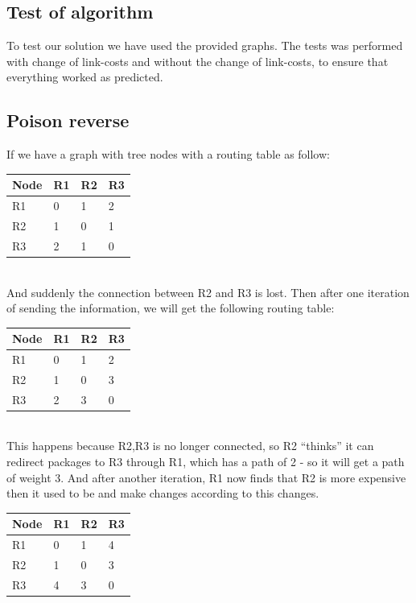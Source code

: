 \documentclass{mall}
\begin{document}
\subsection{Test of algorithm}
To test our solution we have used the provided graphs. The tests was performed with change of link-costs and without the change of link-costs, to ensure that everything worked as predicted.
\newpage
\subsection{Poison reverse}
If we have a graph with tree nodes with a routing table as follow:
\begin{table}[htb]
\centering
\begin{tabular}{llll}
Node & R1 & R2 & R3\\\hline
R1&     0&	1&	2\\\hline
R2&	1&	0&	1\\\hline
R3&	2&	1&      0\\\hline

\end{tabular}
\end{table}\\
And suddenly the connection between R2 and R3 is lost. Then after one iteration of sending the information, we will get the following routing table:
\begin{table}[htb]
\centering
\begin{tabular}{llll}
Node & R1 & R2 & R3\\\hline
R1&     0&	1&	2\\\hline
R2&	1&	0&	3\\\hline
R3&	2&	3&      0\\\hline

\end{tabular}
\end{table}\\
This happens because R2,R3 is no longer connected, so R2 ``thinks'' it can redirect packages to R3 through R1, which has a path of 2 - so it will get a path of weight 3. And after another iteration, R1 now finds that R2 is more expensive then it used to be and make changes according to this changes.\\

\begin{table}[htb]
\centering
\begin{tabular}{llll}
Node & R1 & R2 & R3\\\hline
R1&     0&	1&	4\\\hline
R2&	1&	0&	3\\\hline
R3&	4&	3&      0\\\hline

\end{tabular}
\end{table}
\end{document}
